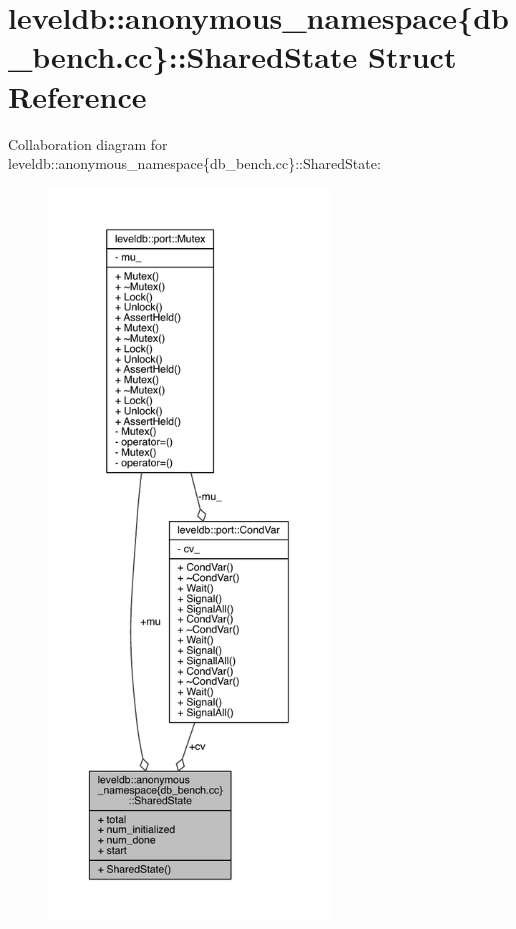 \hypertarget{structleveldb_1_1anonymous__namespace_02db__bench_8cc_03_1_1_shared_state}{}\section{leveldb\+:\+:anonymous\+\_\+namespace\{db\+\_\+bench.\+cc\}\+:\+:Shared\+State Struct Reference}
\label{structleveldb_1_1anonymous__namespace_02db__bench_8cc_03_1_1_shared_state}


Collaboration diagram for leveldb\+:\+:anonymous\+\_\+namespace\{db\+\_\+bench.\+cc\}\+:\+:Shared\+State\+:
\nopagebreak
\begin{figure}[H]
\begin{center}
\leavevmode
\includegraphics[height=550pt]{structleveldb_1_1anonymous__namespace_02db__bench_8cc_03_1_1_shared_state__coll__graph}
\end{center}
\end{figure}
